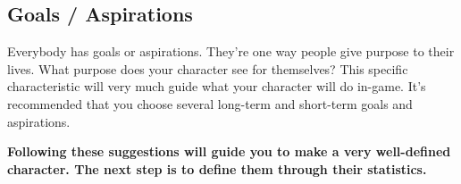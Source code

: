 \subsection{Goals / Aspirations} \label{subsec:goals_aspirations}

Everybody has goals or aspirations. They're one way people give purpose to their lives. What purpose does your character see for themselves? This specific characteristic will very much guide what your character will do in-game. It's recommended that you choose several long-term and short-term goals and aspirations.


\textbf{Following these suggestions will guide you to make a very well-defined character. The next step is to define them through their statistics.}
